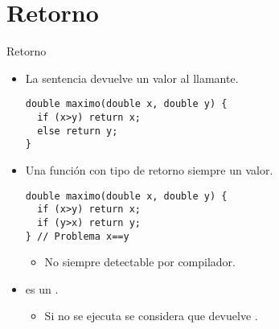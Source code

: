 \section{Retorno}

\begin{frame}[fragile]{Retorno}
\begin{itemize}
  \item La sentencia  devuelve un valor al llamante.
\begin{lstlisting}
double maximo(double x, double y) {
  if (x>y) return x;
  else return y;
}
\end{lstlisting}

  \item Una función con tipo de retorno  siempre un valor.
\begin{lstlisting}
double maximo(double x, double y) {
  if (x>y) return x;
  if (y>x) return y;
} // Problema x==y
\end{lstlisting}
    \begin{itemize}
      \item No siempre detectable por compilador.
    \end{itemize}

  \item {} es un .
    \begin{itemize}
      \item Si no se ejecuta  se considera que devuelve .
    \end{itemize}
\end{itemize}
\end{frame}
